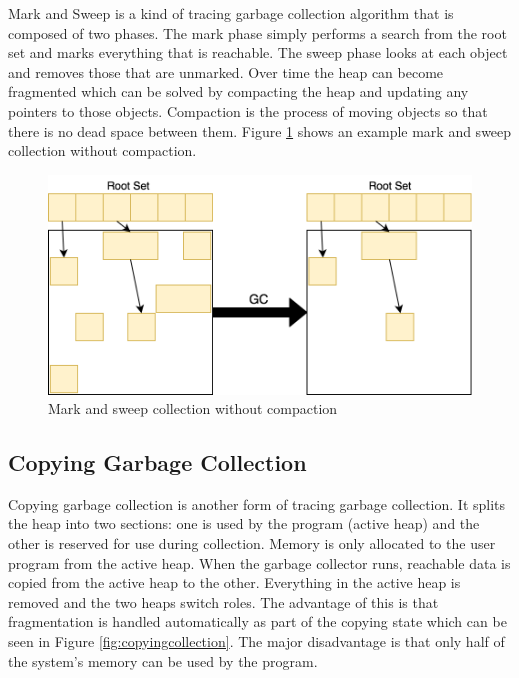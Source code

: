 \documentclass[../diss.tex]{subfiles}
\begin{document}
Mark and Sweep is a kind of tracing garbage collection algorithm that is composed of two phases. The mark phase simply performs a search from the root set and marks everything that is reachable. The sweep phase looks at each object and removes those that are unmarked. Over time the heap can become fragmented which can be solved by compacting the heap and updating any pointers to those objects. Compaction is the process of moving objects so that there is no dead space between them. Figure \ref{fig:markandsweepcollection} shows an example mark and sweep collection without compaction.

\begin{figure}
    \centering
    \includegraphics[max width=\linewidth]{figs/markandsweep.png}
    \caption{Mark and sweep collection without compaction}
    \label{fig:markandsweepcollection}
\end{figure}

\subsection{Copying Garbage Collection}

Copying garbage collection \cite{copyingcollector} is another form of tracing garbage collection. It splits the heap into two sections: one is used by the program (active heap) and the other is reserved for use during collection. Memory is only allocated to the user program from the active heap. When the garbage collector runs, reachable data is copied from the active heap to the other. Everything in the active heap is removed and the two heaps switch roles. The advantage of this is that fragmentation is handled automatically as part of the copying state which can be seen in Figure \ref{fig:copyingcollection}. The major disadvantage is that only half of the system's memory can be used by the program.
\end{document}
